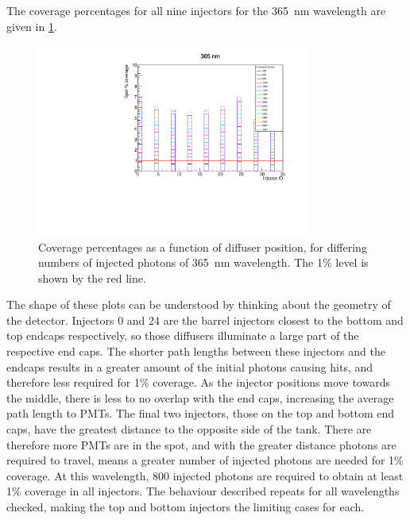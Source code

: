 \documentclass[a4paper,11pt]{article}
\begin{document}
The coverage percentages for all nine injectors for the 365~nm wavelength are given in \cref{fig:coverage_365}.
\begin{figure}
\centering
\includegraphics[width=0.8\textwidth]{coverage_365.pdf}
\caption{Coverage percentages as a function of diffuser position, for differing numbers of injected photons of 365~nm wavelength. The 1\% level is shown by the red line.}\label{fig:coverage_365}
\end{figure}
The shape of these plots can be understood by thinking about the geometry of the detector. Injectors 0 and 24 are the barrel injectors closest to the bottom and top endcaps respectively, so those diffusers illuminate a large part of the respective end caps. The shorter path lengths between these injectors and the endcaps results in a greater amount of the initial photons causing hits, and therefore less required for 1\% coverage. As the injector positions move towards the middle, there is less to no overlap with the end caps, increasing the average path length to PMTs. The final two injectors, those on the top and bottom end caps, have the greatest distance to the opposite side of the tank. There are therefore more PMTs are in the spot, and with the greater distance photons are required to travel, means a greater number of injected photons are needed for 1\% coverage. At this wavelength, 800 injected photons are required to obtain at least 1\% coverage in all injectors. The behaviour described repeats for all wavelengths checked, making the top and bottom injectors the limiting cases for each.
\end{document}
